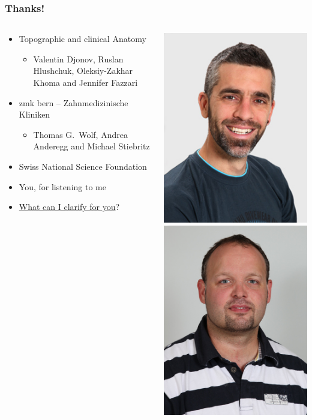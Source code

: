 \documentclass[aspectratio=169]{beamer}
\newcommand{\imheight}{0.8\paperheight}%
\begin{document}
\renewcommand{\imheight}{0.309\paperheight}%
\begin{frame}%
	\frametitle{Thanks!}%
	\begin{columns}%
		\begin{column}{0.5\linewidth}%
		\begin{itemize}%
			\item Topographic and clinical Anatomy%
			\begin{itemize}%
				\item Valentin Djonov, Ruslan Hlushchuk, Oleksiy-Zakhar Khoma and Jennifer Fazzari%
			\end{itemize}%
			\item zmk bern – Zahnmedizinische Kliniken%
			\begin{itemize}%
				\item Thomas G.\ Wolf, Andrea Anderegg and Michael Stiebritz%
			\end{itemize}%
			\item Swiss National Science Foundation%
			\item<2-> You, for listening to me%
			\item<3-> \href{https://twitter.com/ElaineLuther/status/1195708328854331392}{What can I clarify for you}?%
		\end{itemize}%
		\end{column}%
		\begin{column}{0.5\linewidth}%
			\centering%
			\includegraphics[height=\imheight]{./images/kopf_dh}%
			\includegraphics[height=\imheight]{./images/kopf_rh}%

\end{column}
\end{columns}
\end{frame}
\end{document}
